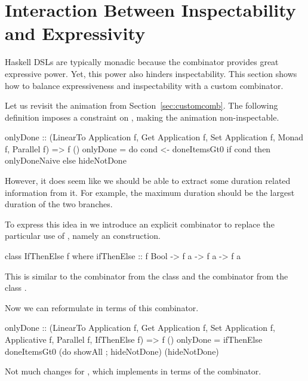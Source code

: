\section{Interaction Between Inspectability and Expressivity}
\label{sec:interaction}

Haskell DSLs are typically monadic because the \hs{>>=} combinator provides
great expressive power. Yet, this power also hinders inspectability. This section shows how to balance 
expressiveness and inspectability with a custom combinator.

Let us revisit the  animation from Section~\ref{sec:customcomb}. The following definition imposes a  constraint on , making the animation non-inspectable.

\begin{spec}
onlyDone :: (LinearTo Application f, Get Application f,
  Set Application f, Monad f, Parallel f) => f ()
onlyDone = do
  cond <- doneItemsGt0
  if cond then onlyDoneNaive else hideNotDone
\end{spec}

However, it does seem like we should be able to extract some duration related
information from it. For example, the maximum duration should be the largest
duration of the two branches.

To express this idea in \dsl{} we introduce an explicit combinator to replace
the particular use of \hs{>>=}, namely an  construction. 

\begin{code}
class IfThenElse f where
  ifThenElse :: f Bool -> f a -> f a -> f a
\end{code}

This is similar to the  combinator from the  class
\cite{DBLP:phd/ethos/Yallop10} and the  combinator from the
 class \cite{Mokhov:2019:SAF:3352468.3341694}.

Now we can reformulate  in terms of this  combinator.

\begin{code}
onlyDone :: (LinearTo Application f, Get Application f,
  Set Application f, Applicative f, Parallel f, IfThenElse f)
  => f ()
onlyDone = ifThenElse doneItemsGt0
  (do showAll ; hideNotDone)
  (hideNotDone)
\end{code}

Not much changes for , which implements  in terms of
the \hs{>>=} combinator. 

